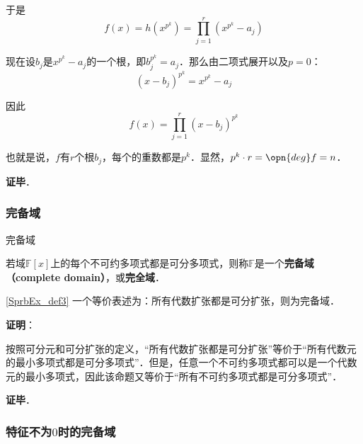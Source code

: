 于是
\begin{equation}
f(x) = h(x^{p^k}) = \prod_{j=1}^{r}(x^{p^k}-a_j)
\end{equation}

现在设$b_j$是$x^{p^k}-a_j$的一个根，即$b_j^{p^k}=a_j$．那么由二项式展开以及$p=0$：
\begin{equation}
(x-b_j)^{p^k} = x^{p^k}-a_j
\end{equation}

因此
\begin{equation}
f(x) = \prod_{j=1}^{r} (x-b_j)^{p^k}
\end{equation}

也就是说，$f$有$r$个根$b_j$，每个的重数都是$p^k$．显然，$p^k\cdot r = \opn{deg}f = n$．

\textbf{证毕}．







\subsubsection{完备域}


\begin{definition}{完备域}\label{SprbEx_def3}

若域$\mathbb{F}[x]$上的每个不可约多项式都是可分多项式，则称$\mathbb{F}$是一个\textbf{完备域（complete domain）}，或\textbf{完全域}．


\end{definition}

\begin{theorem}{}\label{SprbEx_the5}
\autoref{SprbEx_def3} 一个等价表述为：所有代数扩张都是可分扩张，则为完备域．
\end{theorem}




\textbf{证明}：

按照可分元和可分扩张的定义，“所有代数扩张都是可分扩张”等价于“所有代数元的最小多项式都是可分多项式”．但是，任意一个不可约多项式都可以是一个代数元的最小多项式，因此该命题又等价于“所有不可约多项式都是可分多项式”．

\textbf{证毕}．









\subsubsection{特征不为$0$时的完备域}


